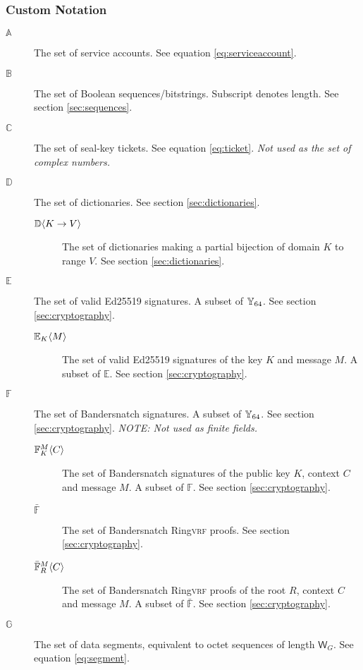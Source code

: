 \subsubsection{Custom Notation}
\begin{description}
  \item[$\mathbb{A}$] The set of service accounts. See equation \ref{eq:serviceaccount}.
  \item[$\mathbb{B}$] The set of Boolean sequences/bitstrings. Subscript denotes length. See section \ref{sec:sequences}.
  \item[$\mathbb{C}$] The set of seal-key tickets. See equation \ref{eq:ticket}. \emph{Not used as the set of complex numbers.}
  \item[$\mathbb{D}$] The set of dictionaries. See section \ref{sec:dictionaries}.
  \begin{description}
    \item[$\dict{K}{V}$] The set of dictionaries making a partial bijection of domain $K$ to range $V$. See section \ref{sec:dictionaries}.
  \end{description}
  \item[$\mathbb{E}$] The set of valid Ed25519 signatures. A subset of $\Y_{64}$. See section \ref{sec:cryptography}.
  \begin{description}
    \item[$\sig{K}{M}$] The set of valid Ed25519 signatures of the key $K$ and message $M$. A subset of $\mathbb{E}$. See section \ref{sec:cryptography}.
  \end{description}
  \item[$\mathbb{F}$] The set of Bandersnatch signatures. A subset of $\Y_{64}$. See section \ref{sec:cryptography}. \emph{NOTE: Not used as finite fields.}
  \begin{description}
    \item[$\bandersig{K}{C}{M}$] The set of Bandersnatch signatures of the public key $K$, context $C$ and message $M$. A subset of $\mathbb{F}$. See section \ref{sec:cryptography}.
    \item[$\bar{\mathbb{F}}$] The set of Bandersnatch Ring\textsc{vrf} proofs. See section \ref{sec:cryptography}.
    \item[$\bandersnatch{R}{C}{M}$] The set of Bandersnatch Ring\textsc{vrf} proofs of the root $R$, context $C$ and message $M$. A subset of $\bar{\mathbb{F}}$. See section \ref{sec:cryptography}.
  \end{description}
  \item[$\mathbb{G}$] The set of data segments, equivalent to octet sequences of length $\mathsf{W}_G$. See equation \ref{eq:segment}.

\end{description}
